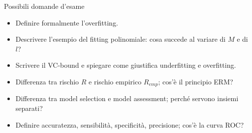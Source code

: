 \begin{boxquestion}{Possibili domande d'esame}

\begin{itemize}
\tightlist
\item
  Definire formalmente l'overfitting.
\item
  Descrivere l'esempio del fitting polinomiale: cosa succede al variare
  di \(M\) e di \(l\)?
\item
  Scrivere il VC-bound e spiegare come giustifica underfitting e
  overfitting.
\item
  Differenza tra rischio \(R\) e rischio empirico \(R_{emp}\); cos'è il
  principio ERM?
\item
  Differenza tra model selection e model assessment; perché servono
  insiemi separati?
\item
  Definire accuratezza, sensibilità, specificità, precisione; cos'è la
  curva ROC?
\end{itemize}

\end{boxquestion}
